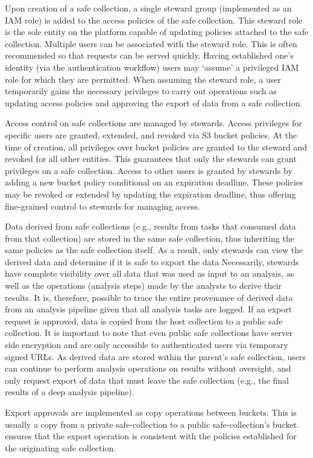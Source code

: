Upon creation of a safe collection, a single steward group (implemented as an IAM role) is added to the
access policies of the safe collection. This steward role is the sole entity on the platform capable of
updating policies attached to the safe collection.
Multiple users can be associated with the steward role. This is often recommended so
that requests can be served quickly.
Having established one's identity (via the \NAME authentication workflow) users
may `assume' a privileged IAM role for which they are permitted.
When assuming the steward role, a user temporarily gains the necessary privileges to carry out operations such
as updating access policies and approving the export of data from a safe collection.

Access control on safe collections are managed by stewards. Access privileges for specific users
are granted, extended, and revoked via S3 bucket policies. At the time of creation, all
privileges over bucket policies are granted to the steward and revoked for all other entities. This
guarantees that only the stewards can grant privileges on a safe collection. Access to other users
is granted by stewards by adding a new bucket policy conditional on an expiration deadline. These policies may be revoked or
extended by updating the expiration deadline, thus offering fine-grained control to stewards for managing
access.

Data derived from safe collections (e.g., results from tasks that consumed data from that collection)
are stored in the same safe collection, thus inheriting the same policies as the safe collection itself.
As a result, only stewards can view the derived data and determine if it is safe to
export the data
Necessarily, stewards have complete visibility over all data that was used as input to an analysis, as
well as the operations (analysis steps) made by the analysts to derive their results.
It is, therefore, possible to trace the entire provenance of derived data from an
analysis pipeline given that all analysis tasks are logged.
If an export request is approved, data is copied from the host collection to a public safe collection.
It is important to note that even public safe collections have server side encryption and
are only accessible to authenticated users via temporary signed URLs.
As derived data are stored within the parent's safe collection, users can continue
to perform analysis operations on results without oversight,
and only request export of data that must leave the safe collection (e.g., the
final results of a deep analysis pipeline).

Export approvals are implemented as copy operations between buckets. This is usually a copy from a
private safe-collection to a public safe-collection's bucket.
\NAME ensures that the export operation is consistent with the policies established for the originating
safe collection.


